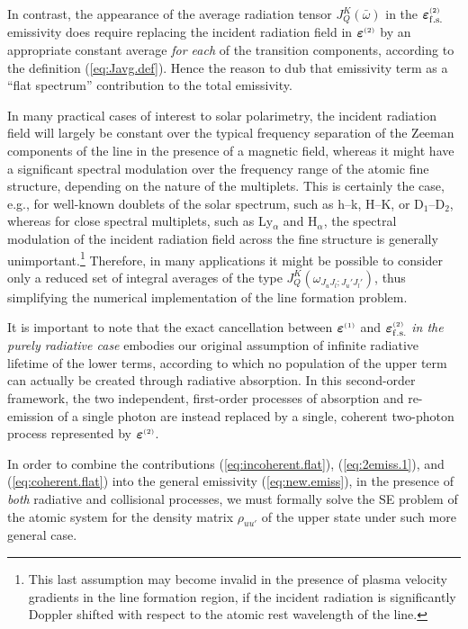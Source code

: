 \documentclass[preprint]{aastex}
\newcommand{\<}{{\kern-5pt}}
\newcommand{\apx}[1]{^{\mbox{\tiny{(#1)}}}}
\begin{document}
In contrast, the appearance of the average radiation tensor 
$J^K_Q(\bar\omega)$ in the $\bm{\varepsilon}\apx{2}_{\rm f.s.}$
emissivity does require replacing the incident radiation field in 
$\bm{\varepsilon}\apx{2}$ by an appropriate constant average 
\emph{for each} 
of the transition components, according to the definition 
(\ref{eq:Javg.def}). Hence the reason to dub that emissivity 
term as a ``flat spectrum'' contribution to the total emissivity.

In many practical cases of interest to solar 
polarimetry, the incident radiation field will largely be constant over 
the typical frequency separation of the Zeeman components of the line
in the presence of a magnetic field, whereas it might have a significant 
spectral modulation over the frequency range of the atomic fine 
structure, depending on the nature of the multiplets. This is certainly 
the case, e.g., for well-known doublets of the solar spectrum, such as 
 h--k,  H--K, or  D$_1$--D$_2$, 
whereas for close spectral multiplets, such as  Ly$_\alpha$ 
and H$_\alpha$, the spectral modulation of the incident radiation field 
across the fine structure is generally unimportant.\footnote{This last 
assumption may become invalid in the presence of plasma velocity 
gradients in the line formation region, if the incident radiation 
is significantly Doppler shifted with respect to the atomic rest 
wavelength of the line.}
%
Therefore, in many applications it might be possible to
consider only a reduced set of integral averages of the type
$J^K_Q(\omega_{J_uJ_l;J_u'J_l'})$, thus simplifying the
numerical implementation of the line formation problem.

It is important to note that the exact cancellation between 
$\bm{\varepsilon}\apx{1}$ and
$\bm{\varepsilon}\apx{2}_{\rm f.s.}$ \emph{in the purely radiative case}
embodies our original assumption of infinite radiative lifetime of 
the lower terms, according to which no population of the upper term can 
actually be created through radiative absorption. In this second-order
framework, the two independent, first-order processes of absorption and 
re-emission of a single photon are instead replaced by a single, coherent
two-photon process represented by $\bm{\varepsilon}\apx{2}$.

In order to combine the contributions (\ref{eq:incoherent.flat}),
(\ref{eq:2emiss.1}), and (\ref{eq:coherent.flat}) into the
general emissivity (\ref{eq:new.emiss}), in the presence of
\emph{both} radiative and collisional processes, we must formally solve
the SE problem of the atomic system for the density matrix $\rho_{uu'}$ 
of the upper state under such more general case.
\end{document}
